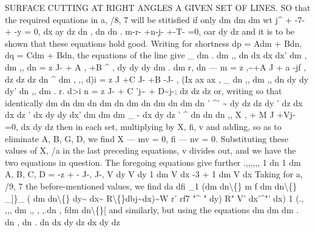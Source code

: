 \documentclass[12pt,a4paper]{article}
\begin{document}
SURFACE CUTTING AT RIGHT ANGLES A GIVEN SET OF LINES.
SO that the required equations
in
a,
/8, 7
will be
stitisfied
if only
dm
dm
dm
wt j\textasciicircum{} + \guillemotleft{} -7- + -y = 0,
dx
ay
dz
dn
,
dn
dn
.
m-r- +n-j-
+-T- =0,
oar
dy
dz
and
it
is
to be shown that these equations
hold good.
Writing
for
shortness
dp = Adm + Bdn,
dq = Cdm + Bdn,
the
equations
of
the
line
give
\_
dm
. dm
,, dn
dx
dx
dx'
dm
, dm
,, dn
= z J- + A
, +B \textasciicircum{}
,
dy
dy
dy
dm
. dm
r, dn
--- m = z ,\textasciitilde{}+A
J
+ a -jf
,
dz
dz
dz
dn
\textasciicircum{} dm
,
,, d)i
= z
J +C J- +B -J-
,
(Ix
ax
ax
, \_
dn
,, dm
,, dn
dy
dy
dy'
dn
,, dm
.
r. d>i
n = z J- + C 'j\textasciitilde{} + D\textasciitilde{}j-;
dz
dz
dz
or, writing
so that
identically
dm dn
dm dn
dm dn
dm dn
dm dn
dm dn
'
\textasciicircum{}'
\textasciitilde{} dy dz
dz dy
'
dz dx
dx dz
'
dx dy
dy dx'
dm
dm
dm \_ -
dx
dy
dz
'
\textasciicircum{} dn
dn
dn
,,
X
,
+ M J
+Vj- =0,
dx
dy
dz
then
in
each
set,
multiplying
by
X,
fi,
v
and
adding,
so
as
to
eliminate A,
B,
G, D,
we
find
X --- mv = 0,
fi --- nv = 0.
Substituting
these
values
of
X,
/a
in
the
last
preceding
equations,
v
divides
out,
and
we have the two equations in question.
The foregoing equations give further
.,,,,,,
1 dn
1 dm
A, B,
C, D = -z + - J-,
J-,
V dy
V dy
1 dm
V dx
-3 +
1 dm
V dx
Taking
for
a,
/9, 7 the before-mentioned
values, we
find
da
dfi \_1 (dm
dn\textbackslash\{\}
m f
dm
dn\textbackslash\{\} \_]\}\_ (
dm
dn\textbackslash\{\}
dy\textasciitilde{} dx\textasciitilde{} R\textbackslash\{\}dbj\textasciitilde{}dx)\textasciitilde{}W r' rf7 "\textasciicircum{} " dy)
R" V' dx'\textasciicircum{}"' dx)
1
(.,
,,, dm
,,
,
,.dn
,
fdm
dn\textbackslash\{\}[
and
similarly, but using the equations
dm
dm
dm
.
dn
,
dn
. dn
dx
dy
dz
dx
dy
dz
\end{document}

